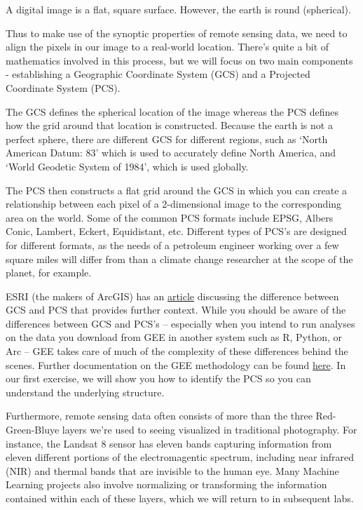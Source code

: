 \documentclass[
]{article}
\begin{document}
A digital image is a flat, square surface. However, the earth is round (spherical).

Thus to make use of the synoptic properties of remote sensing data, we need to align the pixels in our image to a real-world location. There's quite a bit of mathematics involved in this process, but we will focus on two main components - establishing a Geographic Coordinate System (GCS) and a Projected Coordinate System (PCS).

The GCS defines the spherical location of the image whereas the PCS defines how the grid around that location is constructed. Because the earth is not a perfect sphere, there are different GCS for different regions, such as `North American Datum: 83' which is used to accurately define North America, and `World Geodetic System of 1984', which is used globally.

The PCS then constructs a flat grid around the GCS in which you can create a relationship between each pixel of a 2-dimensional image to the corresponding area on the world. Some of the common PCS formats include EPSG, Albers Conic, Lambert, Eckert, Equidistant, etc. Different types of PCS's are designed for different formats, as the needs of a petroleum engineer working over a few square miles will differ from than a climate change researcher at the scope of the planet, for example.

ESRI (the makers of ArcGIS) has an \href{https://www.esri.com/arcgis-blog/products/arcgis-pro/mapping/gcs_vs_pcs/}{article} discussing the difference between GCS and PCS that provides further context. While you should be aware of the differences between GCS and PCS's -- especially when you intend to run analyses on the data you download from GEE in another system such as R, Python, or Arc -- GEE takes care of much of the complexity of these differences behind the scenes. Further documentation on the GEE methodology can be found \href{https://developers.google.com/earth-engine/guides/projections}{here}. In our first exercise, we will show you how to identify the PCS so you can understand the underlying structure.

Furthermore, remote sensing data often consists of more than the three Red-Green-Bluye layers we're used to seeing visualized in traditional photography. For instance, the Landsat 8 sensor has eleven bands capturing information from eleven different portions of the electromagentic spectrum, including near infrared (NIR) and thermal bands that are invisible to the human eye. Many Machine Learning projects also involve normalizing or transforming the information contained within each of these layers, which we will return to in subsequent labs.
\end{document}
